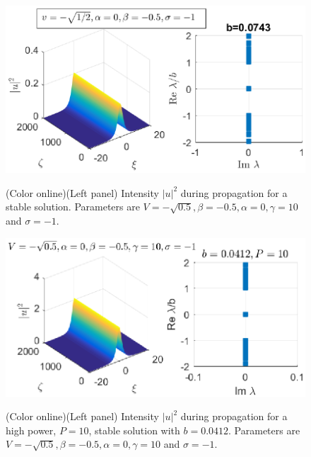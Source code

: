 \documentclass[aps,pre,showpacs,twocolumn]{revtex4}
\begin{document}
\begin{figure}[ht]
\begin{center}
\scalebox{.73} {\includegraphics{prop_V-05_sat10_ds-05_c0_sigma-1.eps}}
\end{center}
\caption{(Color online)(Left panel) Intensity $|u|^2$ during propagation for a stable solution. Parameters are $V=-\sqrt{0.5},\beta=-0.5,\alpha=0,\gamma=10$ and $\sigma=-1$.}%
\label{fig:prop_V-05_sat10_ds-05_c0_sigma-1}%
\end{figure}

\begin{figure}[ht]
\begin{center}
\scalebox{.73} {\includegraphics{prop_V-05_sat10_ds-05_c0_sigma-1_final.eps}}
\end{center}
\caption{(Color online)(Left panel) Intensity $|u|^2$ during propagation for a high power, $P=10$, stable solution with $b=0.0412$. Parameters are $V=-\sqrt{0.5},\beta=-0.5,\alpha=0,\gamma=10$ and $\sigma=-1$.}%
\label{fig:prop_V-05_sat10_ds-05_c0_sigma-1_final}%
\end{figure}
\end{document}
